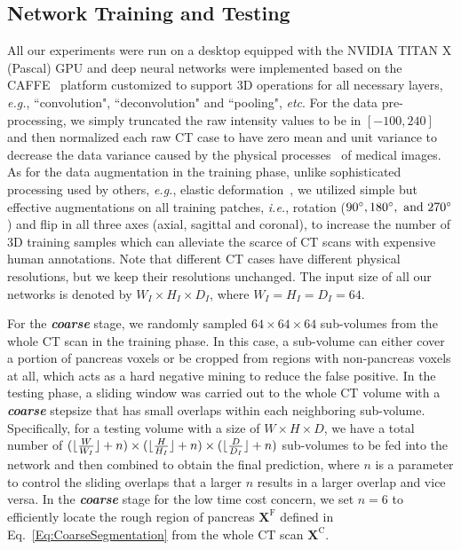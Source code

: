 \documentclass[10pt,twocolumn,letterpaper]{article}
\DeclarePairedDelimiter\floor{\lfloor}{\rfloor}
\begin{document}
\subsection{Network Training and Testing}\label{Sec:NetworkTrTs}
All our experiments were run on a desktop equipped with the NVIDIA TITAN X (Pascal) GPU and deep neural networks were implemented based on the CAFFE~\cite{jia2014caffe} platform customized to support 3D operations for all necessary layers, \emph{e.g.}, ``convolution", ``deconvolution" and ``pooling", \emph{etc}. For the data pre-processing, we simply truncated the raw intensity values to be in $[-100, 240]$ and then normalized each raw CT case to have zero mean and unit variance to decrease the data variance caused by the physical processes~\cite{gravel2004method} of medical images. As for the data augmentation in the training phase, unlike sophisticated processing used by others, \emph{e.g.}, elastic deformation~\cite{milletari2016v}\cite{ronneberger2015u}, we utilized simple but effective augmentations on all training patches, \emph{i.e.}, rotation ($90\degree, 180\degree, \textrm{ and } 270\degree$) and flip in all three axes (axial, sagittal and coronal), to increase the number of 3D training samples which can alleviate the scarce of CT scans with expensive human annotations. Note that different CT cases have different physical resolutions, but we keep their resolutions unchanged. The input size of all our networks is denoted by $W_I\times H_I\times D_I$, where $ W_I = H_I = D_I =64$.

For the \textit{\textbf{coarse}} stage, we randomly sampled $64 \times 64 \times 64$ sub-volumes from the whole CT scan in the training phase. In this case, a sub-volume can either cover a portion of pancreas voxels or be cropped from regions with non-pancreas voxels at all, which acts as a hard negative mining to reduce the false positive. In the testing phase, a sliding window was carried out to the whole CT volume with a \textit{\textbf{coarse}} stepsize that has small overlaps within each neighboring sub-volume. Specifically, for a testing volume with a size of $W \times H \times D$, we have a total number of $(\floor{\frac{W}{W_I}} + n) \times (\floor{\frac{H}{H_I}} + n) \times (\floor{\frac{D}{D_I}} + n)$ sub-volumes to be fed into the network and then combined to obtain the final prediction, where $n$ is a parameter to control the sliding overlaps that a larger $n$ results in a larger overlap and vice versa. In the \textit{\textbf{coarse}} stage for the low time cost concern, we set $n = 6$ to efficiently locate the rough region of pancreas $\mathbf{X}^\textrm{F}$ defined in Eq.~\ref{Eq:CoarseSegmentation} from the whole CT scan $\mathbf{X}^\textrm{C}$.
\end{document}
